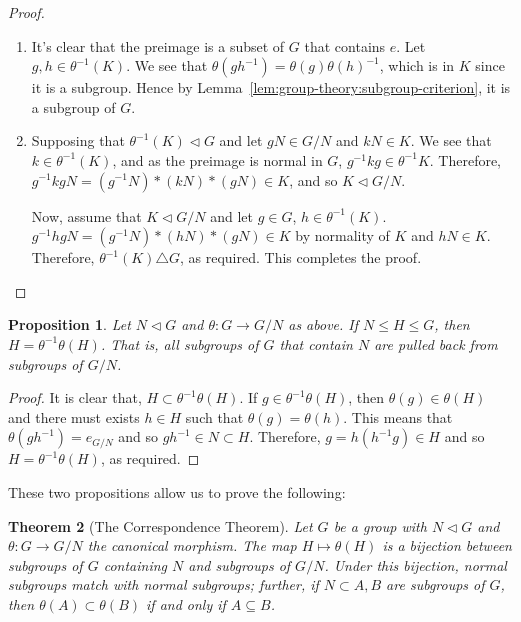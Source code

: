 \documentclass[12pt]{report}
\newtheorem{theorem}{Theorem}[section] %
\newtheorem{proposition}[theorem]{Proposition}
\theoremstyle{definition}
\begin{document}
\begin{proof}
  \begin{enumerate}
  \item
    It's clear that the preimage is a subset of \(G\) that contains \(e\).
    Let \(g, h \in \theta^{-1}(K)\).
    We see that \(\theta(gh^{-1}) = \theta(g)\theta(h)^{-1}\), which is in \(K\) since it is a subgroup.
    Hence by Lemma~\ref{lem:group-theory:subgroup-criterion}, it is a subgroup of \(G\).

    \item
      Supposing that \(\theta^{-1}(K) \triangleleft G\) and let \(gN \in G/N\) and \(kN \in K\).
      We see that \(k \in \theta^{-1}(K)\), and as the preimage is normal in \(G\), \(g^{-1}kg \in \theta^{-1}K\).
      Therefore, \(g^{-1}kgN = (g^{-1}N)*(kN)*(gN) \in K\), and so \(K \triangleleft G/N\).

      Now, assume that \(K \triangleleft G/N\) and let \(g \in G\), \(h \in \theta^{-1}(K)\).
      \(g^{-1}hgN = (g^{-1}N)*(hN)*(gN) \in K\) by normality of \(K\) and \(hN \in K\).
      Therefore, \(\theta^{-1}(K) \triangle G\), as required.
      This completes the proof.

  \end{enumerate}
\end{proof}

\begin{proposition}\label{prp:group-theory:normal-subgroups-pullback}
  Let \(N \triangleleft G\) and \(\theta : G \to G/N\) as above. If \(N \leq H \leq G\), then \(H = \theta^{-1}\theta(H)\).
  That is, all subgroups of \(G\) that contain \(N\) are pulled back from subgroups of \(G/N\).
\end{proposition}

\begin{proof}
  It is clear that, \(H \subset \theta^{-1}\theta (H)\).
  If \(g \in \theta^{-1}\theta(H)\), then \(\theta(g) \in \theta(H)\) and there must exists \(h \in H\) such that \(\theta(g) = \theta(h)\).
  This means that \(\theta(g h^{-1}) = e_{G/N}\) and so \(g h^{-1} \in N \subset H\).
  Therefore, \(g = h(h^{-1}g) \in H\) and so \(H = \theta^{-1}\theta(H)\), as required.
\end{proof}



These two propositions allow us to prove the following:

\begin{theorem}[The Correspondence Theorem]
  \label{thm:group-theory:the-correspondence-theorem}
  Let \(G\) be a group with \(N \triangleleft G\) and \(\theta: G \to G/N\) the canonical morphism.
  The map \(H \mapsto \theta(H)\) is a bijection between subgroups of \(G\) containing \(N\) and subgroups of \(G/N\).
  Under this bijection, normal subgroups match with normal subgroups; further, if \(N \subset A,B\) are subgroups of \(G\), then \(\theta(A) \subset \theta(B)\) if and only if \(A \subseteq B\).
\end{theorem}
\end{document}
